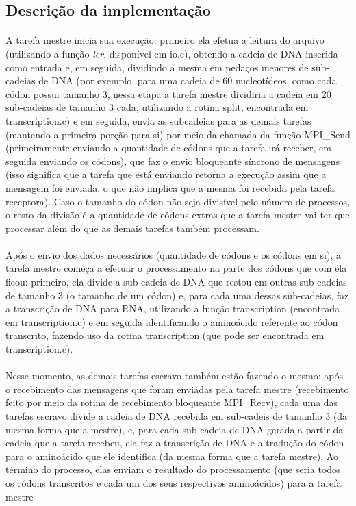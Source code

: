 \documentclass[a4paper,10pt]{article}
\begin{document}
\subsection{Descrição da implementação}
\paragraph{}A tarefa mestre inicia sua execução: primeiro ela efetua a leitura do arquivo (utilizando a função \emph{ler}, disponível em io.c), obtendo a cadeia de DNA inserida como entrada e, em seguida, dividindo a mesma em pedaços menores de sub-cadeias de DNA (por exemplo, para uma cadeia de 60 nucleotídeos, como cada códon possui tamanho 3, nessa etapa a tarefa mestre dividiria a cadeia em 20 sub-cadeias de tamanho 3 cada, utilizando a rotina split, encontrada em transcription.c) e em seguida, envia as subcadeias para as demais tarefas (mantendo a primeira porção para si) por meio da chamada da função MPI\_Send (primeiramente enviando a quantidade de códons que a tarefa irá receber, em seguida enviando os códons), que faz o envio bloqueante síncrono de mensagens (isso significa que a tarefa que está enviando retorna a execução assim que a mensagem foi enviada, o que não implica que a mesma foi recebida pela tarefa receptora). Caso o tamanho do códon não seja divisível pelo número de processos, o resto da divisão é a quantidade de códons extras que a tarefa mestre vai ter que processar além do que as demais tarefas também processam.\\
\paragraph{}Após o envio dos dados necessários (quantidade de códons e os códons em si), a tarefa mestre começa a efetuar o processamento na parte dos códons que com ela ficou: primeiro, ela divide a sub-cadeia de DNA que restou em outras sub-cadeias de tamanho 3 (o tamanho de um códon) e, para cada uma dessas sub-cadeias, faz a transcrição de DNA para RNA, utilizando a função transcription (encontrada em transcription.c) e em seguida identificando o aminoácido referente ao códon transcrito, fazendo uso da rotina transcription (que pode ser encontrada em transcription.c).\\
\paragraph{}Nesse momento, as demais tarefas escravo também estão fazendo o mesmo: após o recebimento das mensagens que foram enviadas pela tarefa mestre (recebimento feito por meio da rotina de recebimento bloqueante MPI\_Recv), cada uma das tarefas escravo divide a cadeia de DNA recebida em sub-cadeis de tamanho 3 (da mesma forma que a mestre), e, para cada sub-cadeia de DNA gerada a partir da cadeia que a tarefa recebeu, ela faz a transcrição de DNA e a tradução do códon para o aminoácido que ele identifica (da mesma forma que a tarefa mestre). Ao término do processo, elas enviam o resultado do processamento (que seria todos os códons transcritos e cada um dos seus respectivos aminoácidos) para a tarefa mestre\\
\end{document}
